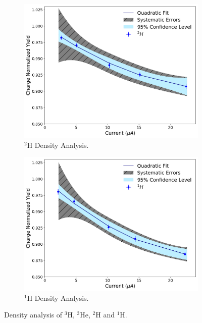 \documentclass[review,numbers,sort&compress]{elsarticle}
\begin{document}
\begin{figure}[h]
\begin{center}
\begin{subfigure}{0.45\textwidth}
    \centering\includegraphics[width=\textwidth]{images/deuterium_data.pdf}
    \caption{$^{2}$H Density Analysis.}
    \label{fig:deuterium_data}
  \end{subfigure}
  \quad
  \begin{subfigure}{0.45\textwidth}
    \centering\includegraphics[width=\textwidth]{images/hydrogen_data.pdf}
    \caption{$^{1}$H Density Analysis.}
    \label{fig:hydrogen_data}
  \end{subfigure}
  \end{center}
  \label{fig:tritium_targets}
  \caption{Density analysis of $^{3}$H, $^{3}$He, $^{2}$H and $^{1}$H.}
\end{figure}
\end{document}
